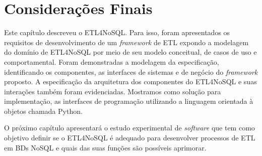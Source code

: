 






\section{Considerações Finais}

Este capítulo descreveu o ETL4NoSQL. Para isso, foram apresentados os requisitos de desenvolvimento de um \textit{framework} de ETL expondo a modelagem do domínio de ETL4NoSQL por meio de seu modelo conceitual, de casos de uso e comportamental. Foram demonstradas a modelagem da especificação, identificando os componentes, as interfaces de sistemas e de negócio do  \textit{framework} proposto. A especificação da arquitetura dos componentes do ETL4NoSQL e suas interações também foram evidenciadas. Mostramos como solução para implementação, as interfaces de programação utilizando a linguagem orientada à objetos chamada Python.

O próximo capítulo apresentará o estudo experimental de \textit{software} que tem como objetivo definir se o ETL4NoSQL é adequado para desenvolver processos de ETL em BDs NoSQL e quais das suas funções são possíveis aprimorar.



